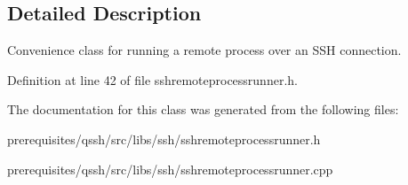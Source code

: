 \subsection{Detailed Description}
Convenience class for running a remote process over an S\+SH connection. 

Definition at line 42 of file sshremoteprocessrunner.\+h.



The documentation for this class was generated from the following files\+:\begin{DoxyCompactItemize}
\item 
prerequisites/qssh/src/libs/ssh/sshremoteprocessrunner.\+h\item 
prerequisites/qssh/src/libs/ssh/sshremoteprocessrunner.\+cpp\end{DoxyCompactItemize}
